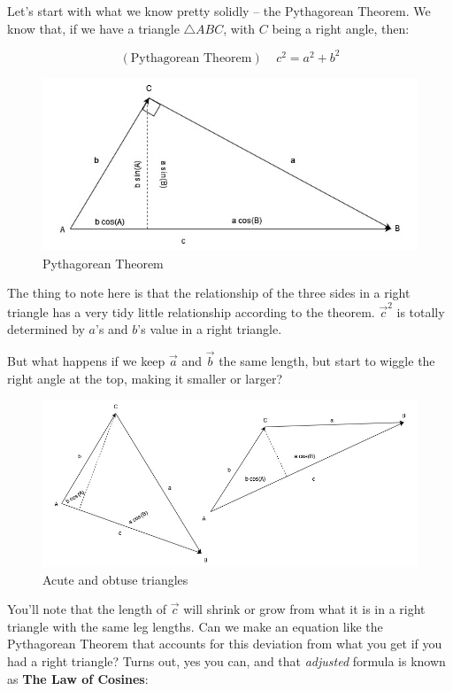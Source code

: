 \documentclass[
]{book}
\begin{document}
Let's start with what we know pretty solidly -- the Pythagorean Theorem. We know that, if we have a triangle \(\triangle ABC\), with \(C\) being a right angle, then:

\[(\text{Pythagorean Theorem}) \ \ \ \ \ c^2 = a^2 + b^2\]

\begin{figure}

{\centering \includegraphics[width=0.75\linewidth,height=0.75\textheight]{images/LofC-PythThm} 

}

\caption{Pythagorean Theorem}\label{fig:unnamed-chunk-1}
\end{figure}

The thing to note here is that the relationship of the three sides in a right triangle has a very tidy little relationship according to the theorem. \(\vec{c}^2\) is totally determined by \(a\)'s and \(b\)'s value in a right triangle.

But what happens if we keep \(\vec{a}\) and \(\vec{b}\) the same length, but start to wiggle the right angle at the top, making it smaller or larger?

\begin{figure}

{\centering \includegraphics[width=0.75\linewidth,height=0.75\textheight]{images/LofC-acute-obtuse} 

}

\caption{Acute and obtuse triangles}\label{fig:unnamed-chunk-2}
\end{figure}

You'll note that the length of \(\vec{c}\) will shrink or grow from what it is in a right triangle with the same leg lengths. Can we make an equation like the Pythagorean Theorem that accounts for this deviation from what you get if you had a right triangle? Turns out, yes you can, and that \emph{adjusted} formula is known as \textbf{The Law of Cosines}:
\end{document}
